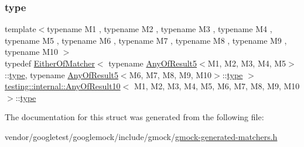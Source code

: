 \subsubsection{\texorpdfstring{type}{type}}
{\footnotesize\ttfamily template$<$typename M1 , typename M2 , typename M3 , typename M4 , typename M5 , typename M6 , typename M7 , typename M8 , typename M9 , typename M10 $>$ \\
typedef \hyperlink{classtesting_1_1internal_1_1_either_of_matcher}{Either\+Of\+Matcher}$<$ typename \hyperlink{structtesting_1_1internal_1_1_any_of_result5}{Any\+Of\+Result5}$<$M1, M2, M3, M4, M5$>$\+::\hyperlink{structtesting_1_1internal_1_1_any_of_result10_aa1cb3d733f29716f2015db8a2b6c1c94}{type}, typename \hyperlink{structtesting_1_1internal_1_1_any_of_result5}{Any\+Of\+Result5}$<$M6, M7, M8, M9, M10$>$\+::\hyperlink{structtesting_1_1internal_1_1_any_of_result10_aa1cb3d733f29716f2015db8a2b6c1c94}{type} $>$ \hyperlink{structtesting_1_1internal_1_1_any_of_result10}{testing\+::internal\+::\+Any\+Of\+Result10}$<$ M1, M2, M3, M4, M5, M6, M7, M8, M9, M10 $>$\+::\hyperlink{structtesting_1_1internal_1_1_any_of_result10_aa1cb3d733f29716f2015db8a2b6c1c94}{type}}



The documentation for this struct was generated from the following file\+:\begin{DoxyCompactItemize}
\item 
vendor/googletest/googlemock/include/gmock/\hyperlink{gmock-generated-matchers_8h}{gmock-\/generated-\/matchers.\+h}\end{DoxyCompactItemize}
